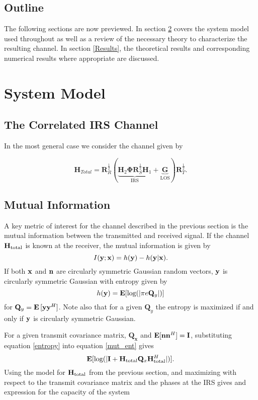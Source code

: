 \documentclass[12pt,a4paper]{report}
\begin{document}
\section{Outline}
The following sections are now previewed. In section \ref{system_model} covers the system model used throughout as well as a review of the necessary theory to characterize the resulting channel. In section \ref{Results}, the theoretical results and corresponding numerical results where appropriate are discussed. 

\chapter{System Model}\label{system_model}
\section{The Correlated IRS Channel}
In the most general case we consider the channel given by 

	\begin{equation}
	\mathbf{H}_{Total} = \mathbf{R}_{R}^{\frac{1}{2}}(\underbrace{\mathbf{H}_{2}\boldsymbol{\Phi}\mathbf{R}_{S}^{\frac{1}{2}}\mathbf{H}_{1}}_{\text{IRS}} + \underbrace{\mathbf{G}}_{\text{LOS}})\mathbf{R}_{T}^{\frac{1}{2}}.
	\end{equation}

\section{Mutual Information}\label{sectiond:mut_info}
A key metric of interest for the channel described in the previous section is the mutual information between the transmitted and received signal. If the channel $\mathbf{H}_\text{total}$ is known at the receiver, the mutual information is given by 
\begin{equation}\label{mut_ent}
I(\mathbf{y};\mathbf{x}) = h(\mathbf{y}) - h(\mathbf{y}|\mathbf{x}).
\end{equation}
If both $\mathbf{x}$ and $\mathbf{n}$ are circularly symmetric Gaussian random vectors, $\mathbf{y}$ is circularly symmetric Gaussian with entropy given by \cite{telatar1999capacity} 
\begin{equation}\label{entropy}
h(\mathbf{y}) = \mathop{\bf E{}}[\text{log{}}(|\pi e \mathbf{Q}_{y}|)]
\end{equation}
 for $\mathbf{Q}_{y} = \mathop{\bf E{}}{[\mathbf{y} \mathbf{y}^H]}$. Note also that for a given $\mathbf{Q}_{y}$ the entropy is maximized if and only if $\mathbf{y}$ is circularly symmetric Gaussian.

For a given transmit covariance matrix, $\mathbf{Q_x}$ and $\mathop{\bf E{}}[\mathbf{n}\mathbf{n}^H] = \mathbf{I}$, substituting equation \eqref{entropy} into equation
\eqref{mut_ent} gives
\begin{equation}\label{mut_inf}
\mathop{\bf E{}} [\text{log{}}(|\mathbf{I} + \mathbf{H}_\text{total} \mathbf{Q}_x \mathbf{H}_\text{total}^H|)].
\end{equation}
Using the model for $\mathbf{H}_\text{total}$ from the previous section, and maximizing with respect to the
transmit covariance matrix and the phases at the IRS gives and expression for the capacity of the system
\end{document}
